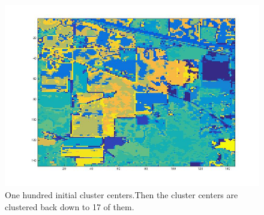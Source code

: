 \documentclass[11pt]{article}
\begin{document}
\begin{figure}[h!]
  \includegraphics[scale=0.45]{km2_100cc.jpg}
  \caption{One hundred initial cluster centers.Then the cluster centers are clustered back down to 17 of them.}
  \label{fig:3}
\end{figure}
\end{document}
